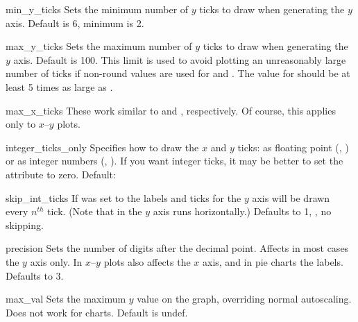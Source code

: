 \begin{AttrDecl}{min\_y\_ticks}
Sets the minimum number of $y$ ticks to draw when generating the $y$
axis. Default is 6, minimum is 2.
\end{AttrDecl}

\begin{AttrDecl}{max\_y\_ticks}
Sets the maximum number of $y$ ticks to draw when generating the $y$
axis. Default is 100. This limit is used to avoid plotting an
unreasonably large number of ticks if non-round values are used for
 and . The value for
 should be at least 5 times as large as
.
\end{AttrDecl}

\begin{AttrDecl}{max\_x\_ticks}
These work similar to  and
, respectively. Of course, this applies only to
$x$--$y$ plots.
\end{AttrDecl}

\begin{AttrDecl}{integer\_ticks\_only}
Specifies how to draw the $x$ and $y$ ticks: as floating point
(, ) or as integer numbers
(, ). If you want integer ticks, it may
be better to set the attribute  to zero. Default:
\end{AttrDecl}

\begin{AttrDecl}{skip\_int\_ticks}
If  was set to  the
labels and ticks for the $y$ axis will be drawn every $n^{th}$ tick.
(Note that in  the $y$ axis runs
horizontally.) Defaults to 1, \ie, no skipping.
\end{AttrDecl}

\begin{AttrDecl}{precision}
Sets the number of digits after the decimal point. Affects in most cases
the $y$ axis only. In $x$--$y$ plots also affects the $x$ axis, and in
pie charts the labels. Defaults to 3.
\end{AttrDecl}

\begin{AttrDecl}{max\_val}
Sets the maximum $y$ value on the graph, overriding normal autoscaling.
Does not work for  charts. Default is undef.
\end{AttrDecl}

